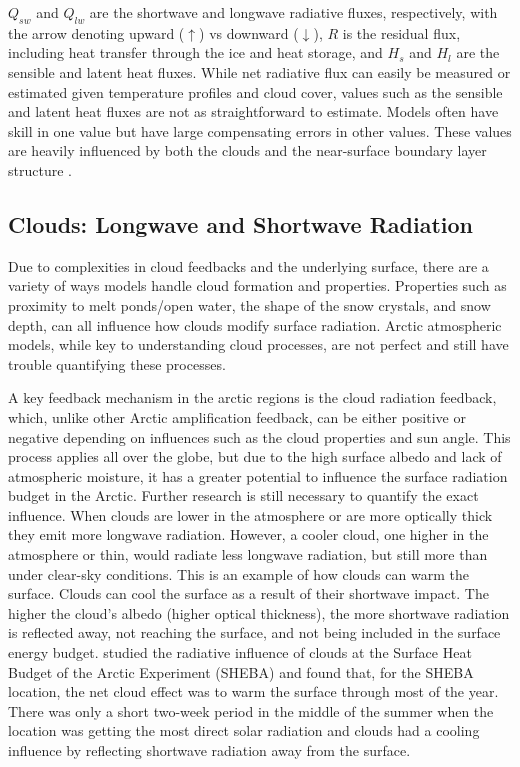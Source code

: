 $Q_{sw}$ and $Q_{lw}$ are the shortwave and longwave radiative fluxes, respectively, with the arrow denoting upward ($\uparrow$) vs downward ($\downarrow$), $R$ is the residual flux, including heat transfer through the ice and heat storage, and $H_{s}$ and $H_{l}$ are the sensible and latent heat fluxes. While net radiative flux can easily be measured or estimated given temperature profiles and cloud cover, values such as the sensible and latent heat fluxes are not as straightforward to estimate. Models often have skill in one value but have large compensating errors in other values. These values are heavily influenced by both the clouds and the near-surface boundary layer structure \citep{tjernstrom:2005}.

\subsection{Clouds: Longwave and Shortwave Radiation}
Due to complexities in cloud feedbacks and the underlying surface, there are a variety of ways models handle cloud formation and properties. Properties such as proximity to melt ponds/open water, the shape of the snow crystals, and snow depth, can all influence how clouds modify surface radiation. Arctic atmospheric models, while key to understanding cloud processes, are not perfect and still have trouble quantifying these processes. 

A key feedback mechanism in the arctic regions is the cloud radiation feedback, which, unlike other Arctic amplification feedback, can be either positive or negative depending on influences such as the cloud properties and sun angle. This process applies all over the globe, but due to the high surface albedo and lack of atmospheric moisture, it has a greater potential to influence the surface radiation budget in the Arctic. Further research is still necessary to quantify the exact influence. When clouds are lower in the atmosphere or are more optically thick they emit more longwave radiation. However, a cooler cloud, one higher in the atmosphere or thin, would radiate less longwave radiation, but still more than under clear-sky conditions. This is an example of how clouds can warm the surface. Clouds can cool the surface as a result of their shortwave impact. The higher the cloud's albedo (higher optical thickness), the more shortwave radiation is reflected away, not reaching the surface, and not being included in the surface energy budget. \citet{intrieri:2002} studied the radiative influence of clouds at the Surface Heat Budget of the Arctic Experiment (SHEBA) and found that, for the SHEBA location, the net cloud effect was to warm the surface through most of the year. There was only a short two-week period in the middle of the summer when the location was getting the most direct solar radiation and clouds had a cooling influence by reflecting shortwave radiation away from the surface. 

